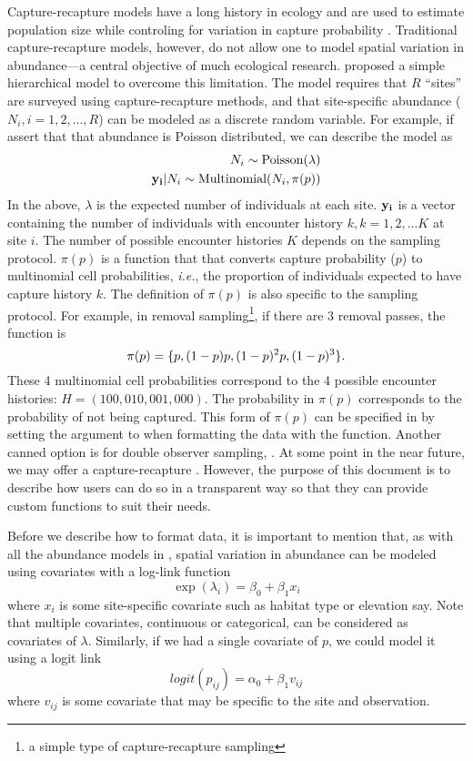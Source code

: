 \documentclass[a4paper]{article}
\begin{document}
Capture-recapture models have a long history in ecology and are used
to estimate population size while controling for variation in capture
probability \citep{williams_etal:2002}. Traditional capture-recapture
models, however, do not
allow one to model spatial variation in abundance---a central
objective of much ecological research. \citet{royle_generalized_2004} proposed a
simple hierarchical model to overcome this limitation. The model
requires that $R$ ``sites'' are surveyed using capture-recapture
methods, and that site-specific abundance ($N_i, i=1,2,...,R$) can be modeled as a discrete
random variable. For example, if assert that that abundance is Poisson
distributed, we can describe the model as
\begin{align}
  N_i \sim \mbox{Poisson}(\lambda) \nonumber \\
  {\bf y_i}|N_i \sim \mbox{Multinomial}(N_i, \pi(p))
  \label{mod}
\end{align}
In the above, $\lambda$ is the expected number of individuals at each
site. ${\bf y_i}$ is a vector containing the number of
individuals with encounter history $k, k=1,2,...K$ at site $i$. The
number of possible encounter histories $K$ depends on the sampling
protocol.
$\pi(p)$ is a function that that converts capture probability ($p$) to
multinomial cell probabilities, \emph{i.e.}, the proportion
of individuals expected to have capture history $k$. The definition of
$\pi(p)$ is also specific to the sampling protocol. For example, in removal
sampling\footnote{a simple type of capture-recapture sampling}, if there are 3
removal passes, the function is
\[
{\bold \pi(p)} = \{p, (1-p)p, (1-p)^2p, (1-p)^3\}.
\]
These 4 multinomial cell probabilities correspond to the 4 possible
encounter histories: $H = (100, 010, 001, 000)$. The probability in
$\pi(p)$ corresponds to the
probability of not being captured. This form of $\pi(p)$ can be
specified in  by setting the argument  to
 when formatting the data with the
 function. Another canned option is for double observer
sampling, . At some point in the near future, we
may offer a capture-recapture
. However, the purpose of this document is to describe how
users can do so in a transparent way so that they can provide
custom functions to suit their needs.

Before we describe how to format data, it is important to mention that,
as with all the abundance models in
, spatial variation in abundance can be modeled using covariates
with a log-link function
\[
\exp(\lambda_i) = \beta_0 + \beta_1 x_i
\]
where $x_i$ is some site-specific covariate such as habitat type or
elevation say. Note that multiple covariates, continuous or
categorical, can be considered as covariates of $\lambda$. Similarly,
if we had a single covariate of $p$, we could model it using a logit link
\[
logit(p_{ij}) = \alpha_0 + \beta_1 v_{ij}
\]
where $v_{ij}$ is some covariate that may be specific to the site and
observation.
\end{document}
